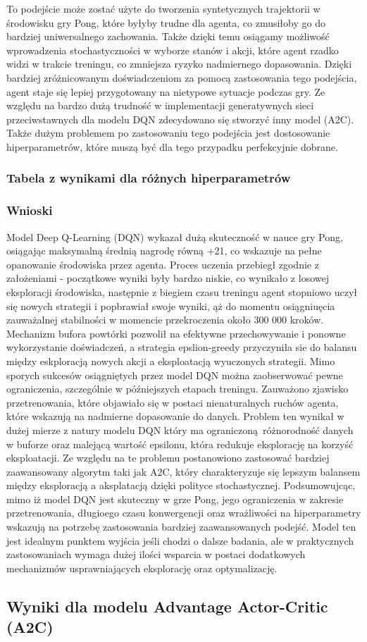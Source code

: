 \documentclass[a4paper, 12pt]{article}
\begin{document}
    To podejście może zostać użyte do tworzenia syntetycznych trajektorii w środowisku gry Pong, które byłyby trudne dla agenta, co zmusiłoby go do bardziej uniwersalnego zachowania.
    Także dzięki temu osiągamy możliwość wprowadzenia stochastyczności w wyborze stanów i akcji, które agent rzadko widzi w trakcie treningu, co zmniejsza ryzyko nadmiernego dopasowania.
    Dzięki bardziej zróżnicowanym doświadczeniom za pomocą zastosowania tego podejścia, agent staje się lepiej przygotowany na nietypowe sytuacje podczas gry. 
    Ze względu na bardzo dużą trudność w implementacji generatywnych sieci przeciwstawnych dla modelu DQN zdecydowano się stworzyć inny model (A2C).
    Także dużym problemem po zastosowaniu tego podejścia jest dostosowanie hiperparametrów, które muszą być dla tego przypadku perfekcyjnie dobrane.
    \subsubsection{Tabela z wynikami dla różnych hiperparametrów}
    \subsubsection{Wnioski}
    Model Deep Q-Learning (DQN) wykazał dużą skuteczność w nauce gry Pong, osiągając maksymalną średnią nagrodę równą +21, co wskazuje na pełne opanowanie środowiska przez agenta.
    Proces uczenia przebiegł zgodnie z założeniami - początkowe wyniki były bardzo niskie, co wynikało z losowej eksploracji środowiska, następnie z biegiem czasu treningu agent stopniowo
    uczył się nowych strategii i popbrawiał swoje wyniki, ąż do momentu osiągniuęcia zauważalnej stabilności w momencie przekroczenia około 300 000 kroków.
    Mechanizm bufora powtórki pozwolił na efektywne przechowywanie i ponowne wykorzystanie doświadczeń, a strategia epslion-greedy przyczyniła sie do balansu między eskploracją 
    nowych akcji a eksploatacją wyuczonych strategii. Mimo sporych sukcesów osiągniętych przez model DQN można zaobserwować pewne ograniczenia, szczególnie w późniejszych etapach treningu.
    Zauważono zjawisko przetrenowania, które objawiało się w postaci nienaturalnych ruchów agenta, które wskazują na nadmierne dopasowanie do danych. Problem ten wynikał w dużej mierze 
    z natury modelu DQN który ma ograniczoną różnorodność danych w buforze oraz malejącą wartość epsilonu, która redukuje eksplorację na korzyść eksploatacji. 
    Ze względu na te problemu postanowiono zastosować bardziej zaawansowany algorytm taki jak A2C, który charakteryzuje się lepszym balansem
    między eksploracją a aksplatacją dzięki polityce stochastycznej. Podsumowujcąc, mimo iż model DQN jest skuteczny w grze Pong, jego ograniczenia
    w zakresie przetrenowania, długioego czasu konwergencji oraz wrażliwości na hiperparametry wskazują na potrzebę zastosowania bardziej zaawansowanych podejść.
    Model ten jest idealnym punktem wyjścia jeśli chodzi o dalsze badania, ale w praktycznych zastosowaniach wymaga dużej ilości wsparcia w postaci dodatkowych 
    mechanizmów usprawniających eksplorację oraz optymalizację.
    \subsection{Wyniki dla modelu Advantage Actor-Critic (A2C)}
\end{document}
